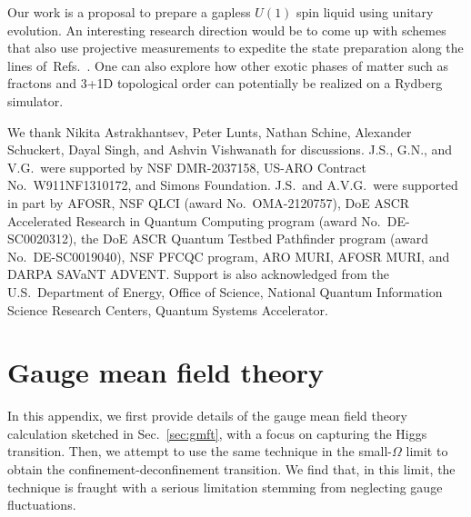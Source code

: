 \documentclass[twocolumn,superscriptaddress,amsmath,amssymb,aps,prx,nofootinbib]{revtex4-2}
\begin{document}
Our work is a proposal to prepare a gapless $U(1)$ spin liquid using unitary evolution. An interesting research direction would be to come up with schemes that also use projective measurements to expedite the state preparation along the lines of~Refs.~\cite{tantivasadakarn2022shortest,lavasani2022monitored}. One can also explore how other exotic phases of matter such as fractons and 3+1D topological order can potentially be realized on a Rydberg simulator.


\begin{acknowledgments}
We thank Nikita Astrakhantsev, Peter Lunts, Nathan Schine, Alexander Schuckert, Dayal Singh, and Ashvin Vishwanath for discussions. J.S., G.N., and V.G.~were  supported by NSF DMR-2037158, US-ARO Contract No.~W911NF1310172, and Simons Foundation. J.S.~and A.V.G.~were supported in part by AFOSR, NSF QLCI (award No.~OMA-2120757), DoE ASCR Accelerated Research in Quantum Computing program (award No.~DE-SC0020312), the DoE ASCR Quantum Testbed Pathfinder program (award No.~DE-SC0019040), NSF PFCQC program, ARO MURI, AFOSR MURI, and DARPA SAVaNT ADVENT. Support is also acknowledged from the U.S.~Department of Energy, Office of Science, National Quantum Information Science Research Centers, Quantum Systems Accelerator.  

\end{acknowledgments}





\appendix


\section{Gauge mean field theory}\label{app:gmft}
In this appendix, we first provide details of the gauge mean field theory calculation sketched in Sec.~\ref{sec:gmft}, with a focus on capturing the Higgs transition. Then, we attempt to use the same technique in the small-$\Omega$ limit to obtain the confinement-deconfinement transition. We find that, in this limit, the technique is fraught with a serious limitation stemming from neglecting gauge fluctuations. 
\end{document}

